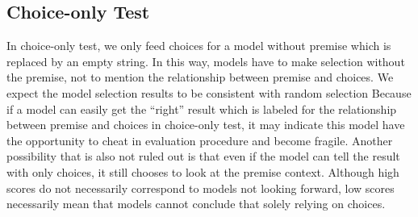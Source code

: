 


\subsection{Choice-only Test}

In choice-only test, we only feed choices for a model without premise which is replaced 
by an empty string. In this way, 
models have to make selection without the premise, not to mention the relationship 
between premise and choices. 
We expect the model selection results to be consistent with random selection
Because if a model can easily get the ``right'' result which 
is labeled for the relationship between premise and choices in choice-only test, 
it may indicate this model have the 
opportunity to cheat in evaluation procedure and become fragile. 
Another possibility that is also not ruled out is that even if the model 
can tell the result with only choices, it still chooses to look at the premise context. 
Although high scores do not necessarily correspond to models not looking forward, 
low scores necessarily mean that models cannot conclude that solely relying on choices. 

